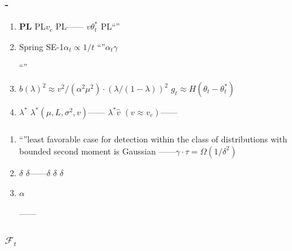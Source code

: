 \documentclass[11pt,a4paper]{article}
\theoremstyle{remark}
\newcommand{\Fforget}{\mathcal{F}}
\begin{document}
\subsubsection*{-}

\begin{enumerate}[label=\textbf{\,\arabic*:}, leftmargin=*]

    \item \textbf{PL}
          PL$v_c$
          PL\textbf{}——
          $v$$\theta_t^*$
          PL``''

    \item \textbf{}
          Spring SE-1$\alpha_t \propto 1/t$
          ``''$\alpha_t$$\gamma$
          
          ``''

    \item \textbf{}
          $b(\lambda)^2 \approx v^2/(\alpha^2\mu^2) \cdot (\lambda/(1-\lambda))^2$
          $g_t \approx H(\theta_t - \theta_t^*)$
          
          

    \item \textbf{$\lambda^*$}
          $\lambda^*$$(\mu, L, \sigma^2, v)$——
          $\lambda^*$$\hat{v}$
          $(v \approx v_c)$——

\end{enumerate}

\subsubsection*{}

\begin{enumerate}[label=\textbf{\,\arabic*:}, leftmargin=*]

    \item \textbf{}
          ``''least favorable case
          for detection within the class of distributions with bounded second moment
          is Gaussian
          ——$\gamma \cdot \tau = \Omega(1/\delta^2)$
          

    \item \textbf{$\delta$}
          $\delta$——$\delta$
          \textbf{}$\delta$
          \textbf{}$\delta$

    \item \textbf{}
          $\alpha$
          
          ——

\end{enumerate}

\subsubsection*{$\Fforget_t$}
\end{document}
